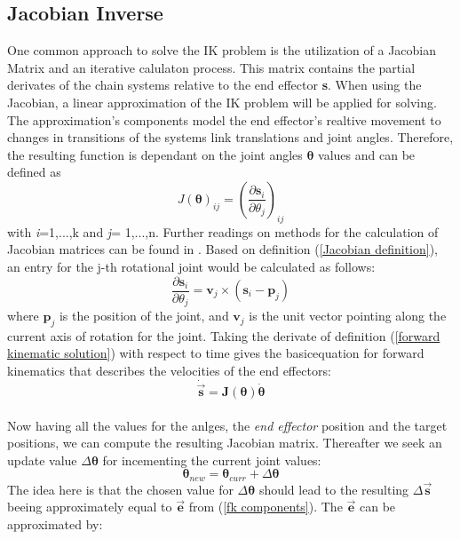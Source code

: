 \subsection{Jacobian Inverse}
One common approach to solve the IK problem is the utilization of a Jacobian Matrix and an iterative calulaton process. This matrix contains the partial derivates of the chain systems relative to the end effector \textbf{s}. When using the Jacobian, a linear approximation  of the IK problem will be applied for solving. The approximation's components model the end effector's realtive movement to changes in transitions of the systems link translations and joint angles. Therefore, the resulting function is dependant on the joint angles $\pmb{\theta}$ values and can be defined as
\begin{equation}
\label{Jacobian definition}
J(\pmb{\theta})_{ij}=\left(\frac{\partial\textbf{s}_{i}}{\partial\theta_{j}}\right)_{ij}
\end{equation}
with \textit{i}=1,...,k and \textit{j}= 1,...,n.
Further readings on methods for the calculation of Jacobian matrices can be found in \cite{Orin.1984}. Based on definition (\ref{Jacobian definition}), an entry for the j-th rotational joint would be calculated as follows:
\begin{equation}
\label{Jacobian entry calc}
\frac{\partial \textbf{s}_{i}}{\partial \theta_{j}}= \textbf{v}_{j}\times(\textbf{s}_{i}-\textbf{p}_{j})
\end{equation}
where $\textbf{p}_{j}$ is the position of the joint, and $\textbf{v}_{j}$ is the unit vector pointing along the current axis of rotation for the joint.
Taking the derivate of definition (\ref{forward kinematic solution}) with respect to time gives the basicequation for forward kinematics that describes the velocities of the end effectors:
\begin{equation}
\label{fk derivate}
\dot{\vec{\pmb{s}}}=\pmb{J}\pmb{(\theta)}\dot{\pmb{\theta}}
\end{equation}
\\ Now having all the values for the anlges, the \textit{end effector} position and the target positions, we can compute the resulting Jacobian matrix.
Thereafter we seek an update value $\Delta\pmb{\theta}$ for incementing the current joint values:
\begin{equation}
\label{theta calc}
\pmb{\theta}_{new}=\pmb{\theta}_{curr}+\Delta\pmb{\theta}
\end{equation}
The idea here is that the  chosen value for $\Delta\pmb{\theta}$ should lead to the resulting $\Delta\pmb{\vec{s}}$ beeing approximately equal to $\vec{\textbf{e}}$ from (\ref{fk components}). The $\vec{\textbf{e}}$ can be approximated by:
